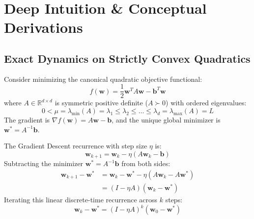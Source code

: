 \section{Deep Intuition \& Conceptual Derivations}

\subsection{Exact Dynamics on Strictly Convex Quadratics}
Consider minimizing the canonical quadratic objective functional:
\begin{equation}
f(\mathbf{w}) = \frac{1}{2}\mathbf{w}^T A \mathbf{w} - \mathbf{b}^T \mathbf{w}
\label{eq:quadratic_obj}
\end{equation}
where $A \in \mathbb{R}^{d \times d}$ is symmetric positive definite ($A \succ 0$) with ordered eigenvalues:
\begin{equation}
0 < \mu = \lambda_{\min}(A) = \lambda_1 \le \lambda_2 \le \dots \le \lambda_d = \lambda_{\max}(A) = L
\end{equation}
The gradient is $\nabla f(\mathbf{w}) = A\mathbf{w} - \mathbf{b}$, and the unique global minimizer is $\mathbf{w}^* = A^{-1}\mathbf{b}$.

The Gradient Descent recurrence with step size $\eta$ is:
\begin{equation}
\mathbf{w}_{k+1} = \mathbf{w}_k - \eta (A\mathbf{w}_k - \mathbf{b})
\end{equation}
Subtracting the minimizer $\mathbf{w}^* = A^{-1}\mathbf{b}$ from both sides:
\begin{align}
\mathbf{w}_{k+1} - \mathbf{w}^* &= \mathbf{w}_k - \mathbf{w}^* - \eta (A\mathbf{w}_k - A\mathbf{w}^*) \nonumber \\
&= (I - \eta A)(\mathbf{w}_k - \mathbf{w}^*)
\end{align}
Iterating this linear discrete-time recurrence across $k$ steps:
\begin{equation}
\mathbf{w}_k - \mathbf{w}^* = (I - \eta A)^k (\mathbf{w}_0 - \mathbf{w}^*)
\label{eq:gd_matrix_power}
\end{equation}

